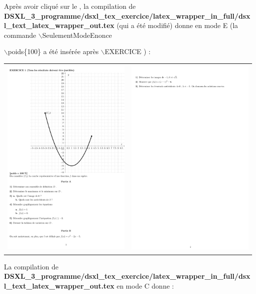 Après avoir cliqué sur le , la compilation de \\
{\bf\small DSXL\_3\_programme/dsxl\_tex\_exercice/latex\_wrapper\_in\_full/dsxl\_text\_latex\_wrapper\_out.tex}
(qui a été modifié) donne en mode E (la commande $\backslash$SeulementModeEnonce{ $\backslash$poids\{100\} a été insérée après $\backslash$EXERCICE )  :
 \begin{center}
 \begin{tabular}{cc}
 \includegraphics[width=7cm,height=10cm]{./images/creation_exercice_09.png}
&
 \includegraphics[width=7cm,height=10cm]{./images/creation_exercice_10.png}
\end{tabular}
\end{center}
La compilation de \\
{\bf\small DSXL\_3\_programme/dsxl\_tex\_exercice/latex\_wrapper\_in\_full/dsxl\_text\_latex\_wrapper\_out.tex}
en mode C donne :

}
